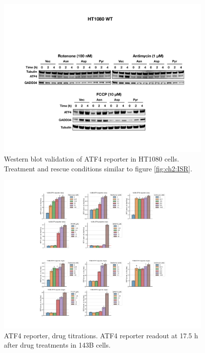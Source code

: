 \begin{figure}
    \centering
    \includegraphics[width=0.95\textwidth]{figures/chap2/app/HT1080_ISR_western.pdf}
    \caption[Mito inhibitor, ATF4 western]{
    Western blot validation of ATF4 reporter in HT1080 cells.
    Treatment and rescue conditions similar to figure \ref{fig:ch2:ISR}.
    }
    \label{fig:app_ch2:HT1080_ISR_western}
\end{figure}



\begin{figure}
    \centering
    \includegraphics[width=0.95\textwidth]{figures/chap2/app/atf4_ETCtit.pdf}
    \caption[ATF4 reporter, drug titrations]{
    ATF4 reporter, drug titrations.
    ATF4 reporter readout at 17.5 h after drug treatments in 143B cells.
    }
    \label{fig:app_ch2:atf4_ETCtit}
\end{figure}




